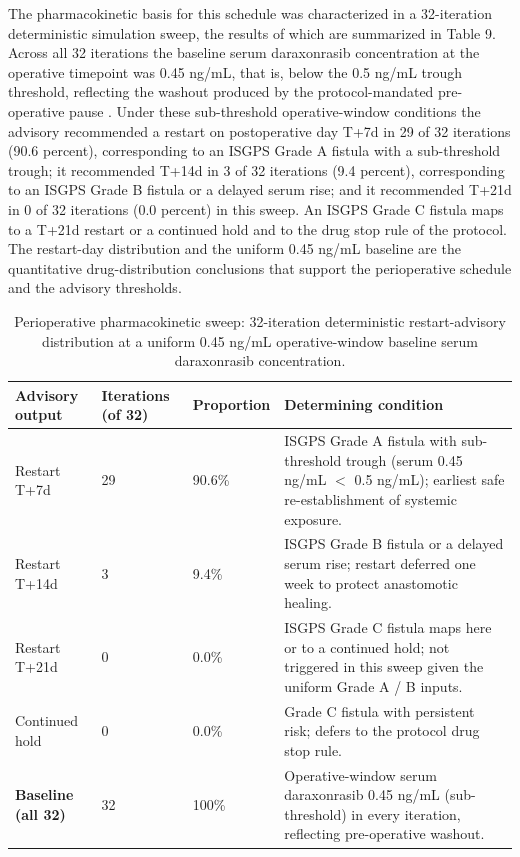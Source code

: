 The pharmacokinetic basis for this schedule was characterized in a 32-iteration
deterministic simulation sweep, the results of which are summarized in Table 9.
Across all 32 iterations the baseline serum daraxonrasib concentration at the
operative timepoint was 0.45 ng/mL, that is, below the 0.5 ng/mL trough
threshold, reflecting the washout produced by the protocol-mandated
pre-operative pause \cite{onpremwhippl}. Under these sub-threshold operative-window
conditions the advisory recommended a restart on postoperative day T+7d in 29 of
32 iterations (90.6 percent), corresponding to an ISGPS Grade A fistula with a
sub-threshold trough; it recommended T+14d in 3 of 32 iterations (9.4 percent),
corresponding to an ISGPS Grade B fistula or a delayed serum rise; and it
recommended T+21d in 0 of 32 iterations (0.0 percent) in this sweep. An ISGPS
Grade C fistula maps to a T+21d restart or a continued hold and to the drug
stop rule of the protocol. The restart-day distribution and the uniform 0.45
ng/mL baseline are the quantitative drug-distribution conclusions that support
the perioperative schedule and the advisory thresholds.

\begin{table}[t]
\centering
\caption{Perioperative pharmacokinetic sweep: 32-iteration deterministic
restart-advisory distribution at a uniform 0.45 ng/mL operative-window baseline
serum daraxonrasib concentration.}
\label{tab:sec07-pk}
\begin{tabularx}{\textwidth}{L{2.5cm} L{1.9cm} L{2.0cm} Y}
\toprule
\textbf{Advisory output} & \textbf{Iterations (of 32)} & \textbf{Proportion} & \textbf{Determining condition} \\
\midrule
Restart T+7d & 29 & 90.6\% & ISGPS Grade A fistula with sub-threshold trough (serum 0.45 ng/mL $<$ 0.5 ng/mL); earliest safe re-establishment of systemic exposure. \\
Restart T+14d & 3 & 9.4\% & ISGPS Grade B fistula or a delayed serum rise; restart deferred one week to protect anastomotic healing. \\
Restart T+21d & 0 & 0.0\% & ISGPS Grade C fistula maps here or to a continued hold; not triggered in this sweep given the uniform Grade A / B inputs. \\
Continued hold & 0 & 0.0\% & Grade C fistula with persistent risk; defers to the protocol drug stop rule. \\
\midrule
\textbf{Baseline (all 32)} & 32 & 100\% & Operative-window serum daraxonrasib 0.45 ng/mL (sub-threshold) in every iteration, reflecting pre-operative washout. \\
\bottomrule
\end{tabularx}
\end{table}

